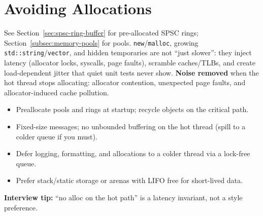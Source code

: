 \section{Avoiding Allocations}
\label{sec:avoiding-allocations}
See Section~\ref{sec:spsc-ring-buffer} for pre-allocated SPSC rings; 
Section~\ref{subsec:memory-pools} for pools.
\newline
\texttt{new}/\texttt{malloc}, growing \texttt{std::string}/\texttt{vector}, and hidden 
temporaries are not ``just slower'': they inject  latency 
(allocator locks, syscalls, page faults), scramble caches/TLBs, and create load-dependent 
jitter that quiet unit tests never show.
\newline
\textbf{Noise removed} when the hot thread stops allocating: allocator contention, 
unexpected page faults, and allocator-induced cache pollution.
\begin{itemize}
    \item Preallocate pools and rings at startup; recycle objects on the critical path.
    \item Fixed-size messages; no unbounded buffering on the hot thread (spill to a colder 
          queue if you must).
    \item Defer logging, formatting, and allocations to a colder thread via a lock-free queue.
    \item Prefer stack/static storage or arenas with LIFO free for short-lived data.
\end{itemize}
\par\noindent\textbf{Interview tip:} ``no alloc on the hot path'' is a latency invariant, 
not a style preference.

